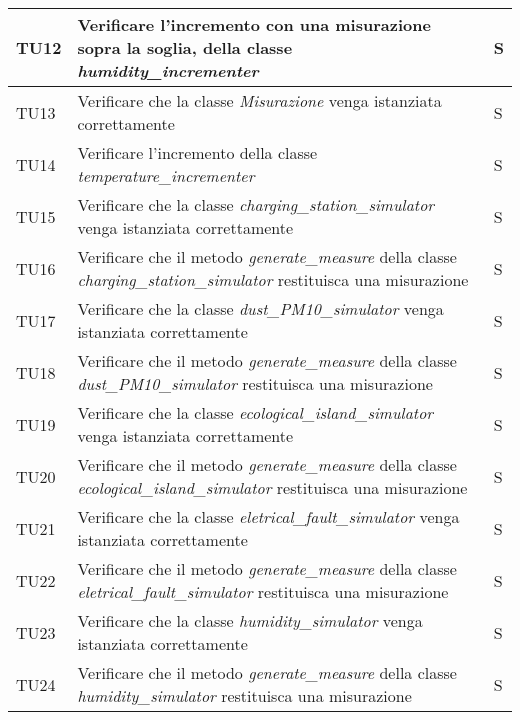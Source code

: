 \begin{longtable}{|C{1.9cm}|L{7cm}|C{2cm}|}
    TU12 & Verificare l'incremento con una misurazione sopra la soglia,  della classe \textit{humidity\_incrementer} & S \\
    \hline

    TU13 & Verificare che la classe \textit{Misurazione} venga istanziata correttamente & S \\
    \hline

    TU14 & Verificare l'incremento della classe \textit{temperature\_incrementer} & S \\
    \hline

    TU15 & Verificare che la classe \textit{charging\_station\_simulator} venga istanziata correttamente & S \\
    \hline

    TU16 & Verificare che il metodo \textit{generate\_measure} della classe \textit{charging\_station\_simulator} restituisca una misurazione & S \\
    \hline

    TU17 & Verificare che la classe \textit{dust\_PM10\_simulator} venga istanziata correttamente & S \\
    \hline

    TU18 & Verificare che il metodo \textit{generate\_measure} della classe \textit{dust\_PM10\_simulator} restituisca una misurazione & S \\
    \hline

    TU19 & Verificare che la classe \textit{ecological\_island\_simulator} venga istanziata correttamente & S \\
    \hline

    TU20 & Verificare che il metodo \textit{generate\_measure} della classe \textit{ecological\_island\_simulator} restituisca una misurazione & S \\
    \hline

    TU21 & Verificare che la classe \textit{eletrical\_fault\_simulator} venga istanziata correttamente & S \\
    \hline

    TU22 & Verificare che il metodo \textit{generate\_measure} della classe \textit{eletrical\_fault\_simulator} restituisca una misurazione & S \\
    \hline

    TU23 & Verificare che la classe \textit{humidity\_simulator} venga istanziata correttamente & S \\
    \hline

    TU24 & Verificare che il metodo \textit{generate\_measure} della classe \textit{humidity\_simulator} restituisca una misurazione & S \\
    \hline


\end{longtable}

